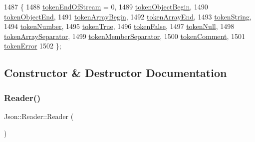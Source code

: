 \begin{DoxyCode}
1487                  \{
1488     \hyperlink{class_json_1_1_reader_aa35e6ab574dc399a0a645ad98ed66bc9a87fd3ad9cae11a8afe2bd022d8ab90f4}{tokenEndOfStream} = 0,
1489     \hyperlink{class_json_1_1_reader_aa35e6ab574dc399a0a645ad98ed66bc9a6196ce743696e6c803b130e8eef970f3}{tokenObjectBegin},
1490     \hyperlink{class_json_1_1_reader_aa35e6ab574dc399a0a645ad98ed66bc9a12d03a3a710b2d3f1384889df3da887d}{tokenObjectEnd},
1491     \hyperlink{class_json_1_1_reader_aa35e6ab574dc399a0a645ad98ed66bc9a366d1a18459ad0c3b5bd32a35391e35a}{tokenArrayBegin},
1492     \hyperlink{class_json_1_1_reader_aa35e6ab574dc399a0a645ad98ed66bc9a9adc87fd67f5fc21391a4be89382a316}{tokenArrayEnd},
1493     \hyperlink{class_json_1_1_reader_aa35e6ab574dc399a0a645ad98ed66bc9ace89d4e0342535b8c00104ed4e5e0cee}{tokenString},
1494     \hyperlink{class_json_1_1_reader_aa35e6ab574dc399a0a645ad98ed66bc9a9b1717bee03ce7016f507bd4598fa5c6}{tokenNumber},
1495     \hyperlink{class_json_1_1_reader_aa35e6ab574dc399a0a645ad98ed66bc9acec3234e26f2d6bf206187fc5d949a03}{tokenTrue},
1496     \hyperlink{class_json_1_1_reader_aa35e6ab574dc399a0a645ad98ed66bc9ac24318c0842c7653c3555a82437b8eb2}{tokenFalse},
1497     \hyperlink{class_json_1_1_reader_aa35e6ab574dc399a0a645ad98ed66bc9a11bd0ba1c34448d075022b89d5bf9853}{tokenNull},
1498     \hyperlink{class_json_1_1_reader_aa35e6ab574dc399a0a645ad98ed66bc9af2c235e8da86f11ffb1a1243e49ed1fa}{tokenArraySeparator},
1499     \hyperlink{class_json_1_1_reader_aa35e6ab574dc399a0a645ad98ed66bc9a08227b96f54242f4f9a8a597403c4424}{tokenMemberSeparator},
1500     \hyperlink{class_json_1_1_reader_aa35e6ab574dc399a0a645ad98ed66bc9ae4fcf05c3b1ce462bacd34af0ccac32b}{tokenComment},
1501     \hyperlink{class_json_1_1_reader_aa35e6ab574dc399a0a645ad98ed66bc9a55d1ab9135c3d068b57fafdbabfa569a}{tokenError}
1502   \};
\end{DoxyCode}


\subsection{Constructor \& Destructor Documentation}
\mbox{\label{class_json_1_1_reader_a0b3c4e24c8393354bab57a6ba3ffc27f}} 
\subsubsection{\texorpdfstring{Reader()}{Reader()}\hspace{0.1cm}{\footnotesize\ttfamily [1/2]}}
{\footnotesize\ttfamily Json\+::\+Reader\+::\+Reader (\begin{DoxyParamCaption}{ }\end{DoxyParamCaption})}



